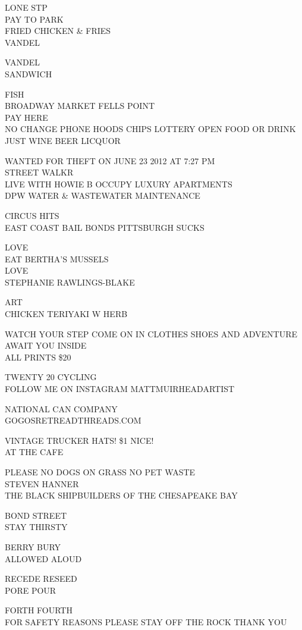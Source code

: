 \documentclass[10pt,letterpaper]{article}
\begin{document}
LONE STP\\
PAY TO PARK\\
FRIED CHICKEN \& FRIES\\
VANDEL

VANDEL\\
SANDWICH

FISH\\
BROADWAY MARKET FELLS POINT\\
PAY HERE\\
NO CHANGE PHONE HOODS CHIPS LOTTERY OPEN FOOD OR DRINK JUST WINE BEER LICQUOR

WANTED FOR THEFT ON JUNE 23 2012 AT 7:27 PM\\
STREET WALKR\\
LIVE WITH HOWIE B OCCUPY LUXURY APARTMENTS\\
DPW WATER \& WASTEWATER MAINTENANCE

CIRCUS HITS\\
EAST COAST BAIL BONDS PITTSBURGH SUCKS

LOVE\\
EAT BERTHA'S MUSSELS\\
LOVE\\
STEPHANIE RAWLINGS{-}BLAKE

ART\\
CHICKEN TERIYAKI W HERB

WATCH YOUR STEP COME ON IN CLOTHES SHOES AND ADVENTURE AWAIT YOU INSIDE\\
ALL PRINTS \$20

TWENTY 20 CYCLING\\
FOLLOW ME ON INSTAGRAM MATTMUIRHEADARTIST

NATIONAL CAN COMPANY\\
GOGOSRETREADTHREADS.COM

VINTAGE TRUCKER HATS! \$1 NICE!\\
AT THE CAFE

PLEASE NO DOGS ON GRASS NO PET WASTE\\
STEVEN HANNER\\
THE BLACK SHIPBUILDERS OF THE CHESAPEAKE BAY

BOND STREET\\
STAY THIRSTY

BERRY BURY\\
ALLOWED ALOUD

RECEDE RESEED\\
PORE POUR

FORTH FOURTH\\
FOR SAFETY REASONS PLEASE STAY OFF THE ROCK THANK YOU
\end{document}
